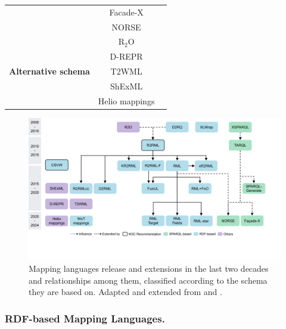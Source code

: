 \begin{table}[t]
{\begin{tabular}{ccc}
                              & Facade-X        & \parencite{daga2021facade,sparqlanything}\\ %
                              & NORSE            & \parencite{stadler2023spark}\\ \midrule
\multirow{5}{*}{\textbf{Alternative schema}}       & R$_2$O          & \parencite{barrasa2004r2o}\\ %
                              & D-REPR          & \parencite{Vu2019d-repr}\\ %
                              & T2WML           & \parencite{szekely2019t2wml}\\ %
                              & ShExML          & \parencite{Garcia-Gonzalez2020shexml,shexml}\\ %
                              & Helio mappings  & \parencite{cimmino2022helio}\\ 
                              \bottomrule
\end{tabular}}
\end{table}



\begin{figure}[t]
\centering
\includegraphics[width=1\linewidth]{figures/chp2_mapping_languages}
\caption[Existing mapping languages and the relationships among them]{Mapping languages release and extensions in the last two decades and relationships among them, classified according to the schema they are based on. Adapted and extended from \cite{chaves2021thesis} and \cite{iglesias2022cm}.}
\label{fig:chp2_mapping_languages}
\end{figure}




\subsubsection{RDF-based Mapping Languages.} 
\label{sec:chp2_RDF-languages}

